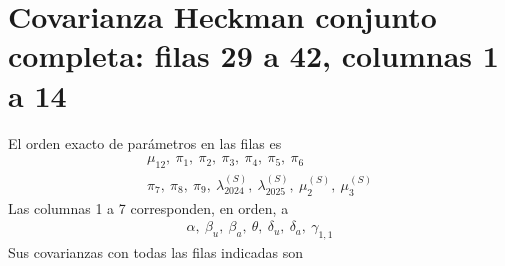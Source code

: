 \documentclass[11pt,a4paper]{article}
\begin{document}
\section{Covarianza Heckman conjunto completa: filas 29 a 42, columnas 1 a 14}
El orden exacto de parámetros en las filas es
\[
\begin{gathered}\mu_12,\ \pi_1,\ \pi_2,\ \pi_3,\ \pi_4,\ \pi_5,\ \pi_6\\\pi_7,\ \pi_8,\ \pi_9,\ \lambda_{2024}^{(S)},\ \lambda_{2025}^{(S)},\ \mu_2^{(S)},\ \mu_3^{(S)}\end{gathered}
\]
Las columnas 1 a 7 corresponden, en orden, a
\[
\begin{gathered}\alpha,\ \beta_u,\ \beta_a,\ \theta,\ \delta_u,\ \delta_a,\ \gamma_{1,1}\end{gathered}
\]
Sus covarianzas con todas las filas indicadas son
\end{document}
